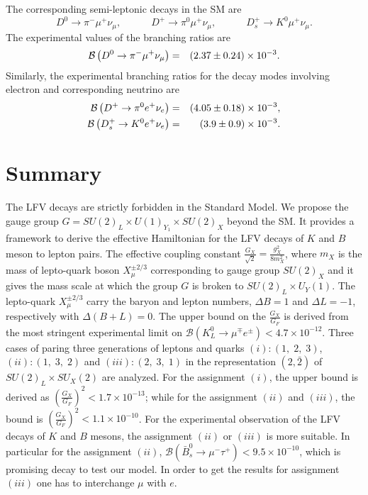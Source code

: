 \documentclass{ws-ijmpa}
\begin{document}
The corresponding semi-leptonic decays in the SM are
\begin{equation}
D^{0} \to \pi^{-} \mu^{+} \nu_{\mu}, \quad\quad\quad D^{+} \to \pi^{0} \mu^{+} \nu_{\mu} ,\quad\quad\quad D_{s}^{+} \to K^{0} \mu^{+} \nu_{\mu}.
\end{equation}
The experimental values of the branching ratios are
\begin{eqnarray}
\mathcal{B}\left(D^{0} \to \pi^{-} \mu^{+} \nu_{\mu}\right) &=& \left(2.37 \pm 0.24\right)\times 10^{-3}\notag .
\end{eqnarray}
Similarly, the experimental branching ratios for the decay modes involving electron and corresponding neutrino are
\begin{eqnarray}
\mathcal{B}\left(D^{+} \to \pi^{0} e^{+} \nu_{e}\right) &=& \left(4.05 \pm 0.18\right)\times 10^{-3}\notag,\\
\mathcal{B}\left(D_{s}^{+} \to K^{0} e^{+} \nu_{e}\right) &=& \left(3.9 \pm 0.9\right)\times 10^{-3}\notag.\\
\end{eqnarray}


\section{Summary }

The LFV decays are strictly forbidden in the Standard Model. We propose the gauge group $G = SU(2)_L\times U(1)_{Y_1}\times SU(2)_X$ beyond the SM. It provides a framework to derive the effective Hamiltonian for the LFV decays of $K$ and $B$ meson to lepton pairs. The effective coupling constant $\frac{G_{X}}{\sqrt{2}} = \frac{g^{2}_X}{8m^2_{X}}$, where $m_{X}$ is the mass of lepto-quark boson $X_{\mu}^{\pm 2/3}$ corresponding to gauge group $SU(2)_X$ and it gives the mass scale at which the group $G$ is broken to $ SU(2)_L\times U_{Y}(1)$. The lepto-quark $X_{\mu}^{\pm 2/3}$ carry the baryon and lepton numbers, $\Delta B  = 1$ and $\Delta L  = -1$, respectively with $\Delta(B + L) = 0$. The upper bound on the $\frac{G_{X}}{G_{F}}$ is derived from the most stringent experimental limit on $\mathcal{B}(K^{0}_{L} \to \mu^{\mp}e^{\pm}) < 4.7 \times 10^{-12}$. Three cases of paring three generations of leptons and quarks $(i): (1,\; 2,\; 3)$, $(ii): (1,\; 3,\; 2)$ and $(iii): (2,\; 3,\; 1)$ in the representation $(2, \bar{2})$ of $ SU(2)_L\times SU_{X}(2)$ are analyzed. For the assignment $(i)$, the upper bound is derived as  $(\frac{G_{X}}{G_{F}})^2< 1.7 \times 10^{-13}$; while for the assignment $(ii)$ and $(iii)$, the bound is  $(\frac{G_{X}}{G_{F}})^2< 1.1 \times 10^{-10}$. For the experimental observation of the LFV decays of $K$ and $B$ mesons, the assignment $(ii)$ or $(iii)$ is more suitable. In particular for the assignment $(ii)$, $\mathcal{B}(\bar{B}_{s}^{0} \to \mu^{-}\tau^{+}) < 9.5 \times 10^{-10}$, which is promising decay to test our model. In order to get the results for assignment $(iii)$ one has to interchange $\mu$ with $e$.
\end{document}
